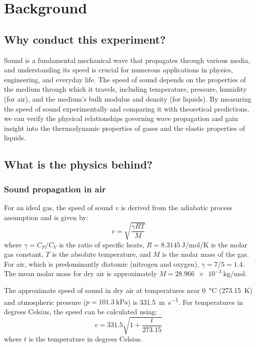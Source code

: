 \documentclass[12pt]{article}
\begin{document}
\section{Background}

\subsection{Why conduct this experiment?}

Sound is a fundamental mechanical wave that propagates through various media, and understanding its speed is crucial for numerous applications in physics, engineering, and everyday life. The speed of sound depends on the properties of the medium through which it travels, including temperature, pressure, humidity (for air), and the medium's bulk modulus and density (for liquids). By measuring the speed of sound experimentally and comparing it with theoretical predictions, we can verify the physical relationships governing wave propagation and gain insight into the thermodynamic properties of gases and the elastic properties of liquids.

\subsection{What is the physics behind?}

\subsubsection{Sound propagation in air}

For an ideal gas, the speed of sound $v$ is derived from the adiabatic process assumption and is given by:
\begin{equation}
v = \sqrt{\frac{\gamma RT}{M}}
\end{equation}
where $\gamma = C_P/C_V$ is the ratio of specific heats, $R = \SI{8.3145}{\joule\per\mole\per\kelvin}$ is the molar gas constant, $T$ is the absolute temperature, and $M$ is the molar mass of the gas. For air, which is predominantly diatomic (nitrogen and oxygen), $\gamma = 7/5 = 1.4$. The mean molar mass for dry air is approximately $M = \SI{28.966e-3}{\kilogram\per\mole}$.

The approximate speed of sound in dry air at temperatures near \SI{0}{\celsius} (\SI{273.15}{\kelvin}) and atmospheric pressure ($p = \SI{101.3}{\kilo\pascal}$) is \SI{331.5}{\meter\per\second}. For temperatures in degrees Celsius, the speed can be calculated using:
\begin{equation}
v = 331.5\sqrt{1 + \frac{t}{273.15}}
\end{equation}
where $t$ is the temperature in degrees Celsius.
\end{document}

